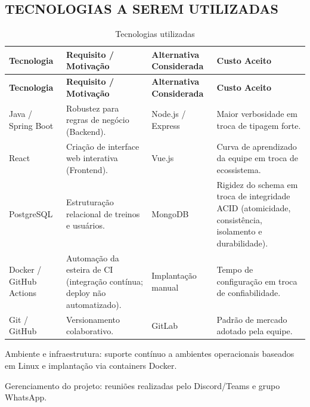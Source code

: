 \subsection{TECNOLOGIAS A SEREM UTILIZADAS}

\begingroup
\small
\setlength{\tabcolsep}{4pt}
\renewcommand{\arraystretch}{1.2}
\begin{longtable}{|>{\raggedright\arraybackslash}p{}|>{\raggedright\arraybackslash}p{}|>{\raggedright\arraybackslash}p{}|>{\raggedright\arraybackslash}p{}|}
\caption{Tecnologias utilizadas}\\
\hline
\textbf{Tecnologia} & \textbf{Requisito / Motivação} & \textbf{Alternativa Considerada} & \textbf{Custo Aceito} \\ \hline
\endfirsthead
\textbf{Tecnologia} & \textbf{Requisito / Motivação} & \textbf{Alternativa Considerada} & \textbf{Custo Aceito} \\ \hline
\endhead
Java / Spring Boot & Robustez para regras de negócio (Backend). & Node.js / Express & Maior verbosidade em troca de tipagem forte. \\ \hline
React & Criação de interface web interativa (Frontend). & Vue.js & Curva de aprendizado da equipe em troca de ecossistema. \\ \hline
PostgreSQL & Estruturação relacional de treinos e usuários. & MongoDB & Rigidez do schema em troca de integridade ACID (atomicidade, consistência, isolamento e durabilidade). \\ \hline
Docker / GitHub Actions & Automação da esteira de CI (integração contínua; deploy não automatizado). & Implantação manual & Tempo de configuração em troca de confiabilidade. \\ \hline
Git / GitHub & Versionamento colaborativo. & GitLab & Padrão de mercado adotado pela equipe. \\ \hline
\end{longtable}
\endgroup


Ambiente e infraestrutura: suporte contínuo a ambientes operacionais baseados em Linux e implantação via containers Docker.

Gerenciamento do projeto: reuniões realizadas pelo Discord/Teams e grupo WhatsApp.
